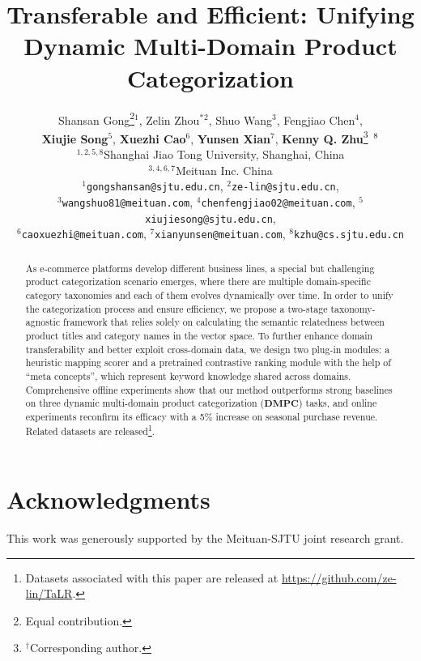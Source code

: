 \documentclass[11pt]{article}
\title{Transferable and Efficient: Unifying \\Dynamic Multi-Domain Product Categorization}
\author{Shansan Gong\thanks{\hspace{2mm}Equal contribution.}\hspace{1.5mm}$^1$, Zelin Zhou$^*$$^2$, Shuo Wang$^3$, Fengjiao Chen$^4$,\\ {\bf Xiujie Song}$^5$, {\bf Xuezhi Cao}$^6$, {\bf Yunsen Xian}$^7$, {\bf Kenny Q. Zhu}\thanks{$^\dagger$\hspace{0.8mm}Corresponding author.}$\hspace{1.5mm}^8$\\
	$^{1,2,5,8}$Shanghai Jiao Tong University, Shanghai, China \\
	$^{3,4,6,7}$Meituan Inc. China \\
	\texttt{$^1$gongshansan@sjtu.edu.cn},
	\texttt{$^2$ze-lin@sjtu.edu.cn}, \\
	\texttt{$^3$wangshuo81@meituan.com},
  \texttt{$^4$chenfengjiao02@meituan.com}, 
  \texttt{$^5$xiujiesong@sjtu.edu.cn}, \\
  \texttt{$^6$caoxuezhi@meituan.com},
  \texttt{$^7$xianyunsen@meituan.com},
	\texttt{$^8$kzhu@cs.sjtu.edu.cn}\\
}
\begin{document}
\maketitle
\begin{abstract}
As e-commerce platforms develop different business lines, a special but challenging product categorization scenario emerges, where there are multiple domain-specific category taxonomies and each of them evolves dynamically over time. 
In order to unify the categorization process and ensure efficiency, we propose a two-stage taxonomy-agnostic framework that relies solely on calculating the semantic relatedness between product titles and category names in the vector space. 
To further enhance domain transferability and better exploit cross-domain data, we design two plug-in modules: a heuristic mapping scorer and a pretrained contrastive ranking module with the help of ``meta concepts'', which represent 
keyword knowledge shared across domains.
Comprehensive offline experiments show that our method outperforms strong baselines
on three dynamic multi-domain product categorization ($\mathbf{DMPC}$) tasks,
and online experiments reconfirm its efficacy with a
5\% increase on seasonal purchase revenue. Related datasets are
released\footnote{Datasets associated with this paper
are released at \url{https://github.com/ze-lin/TaLR}.}.
\end{abstract}





% 

\section*{Acknowledgments}
This work was generously supported by the Meituan-SJTU joint research grant.




\newpage

\appendix


\end{document}
